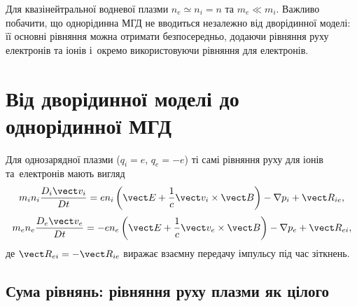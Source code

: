 Для квазінейтральної водневої плазми $n_e\simeq n_i=n$ та $m_e\ll m_i$. Важливо побачити,
що однорідинна МГД не вводиться незалежно від дворідинної моделі: її основні рівняння
можна отримати безпосередньо, додаючи рівняння руху електронів та іонів і~окремо використовуючи рівняння для електронів.


\section{Від дворідинної моделі до однорідинної МГД}


Для однозарядної плазми ($q_i=e$, $q_e=-e$) ті самі рівняння руху для іонів та~електронів мають вигляд
\begin{equation*}
m_i n_i\frac{D_i\vect v_i}{Dt}
=
en_i\left(\vect E+\frac1c\vect v_i\times\vect B\right)
-\nabla p_i+\vect R_{ie},
\end{equation*}
\begin{equation*}
m_e n_e\frac{D_e\vect v_e}{Dt}
=-en_e\left(\vect E+\frac1c\vect v_e\times\vect B\right)
-\nabla p_e+\vect R_{ei},
\end{equation*}
де $\vect R_{ei}=-\vect R_{ie}$ виражає взаємну передачу імпульсу під час зіткнень.


\subsection*{Сума рівнянь: рівняння руху плазми як цілого}


